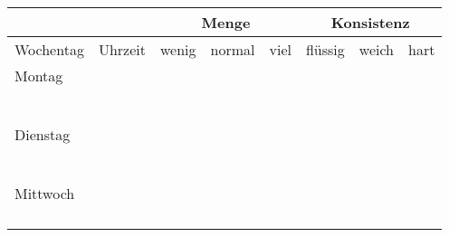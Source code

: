 \documentclass[a4paper]{article}
\begin{document}
\pagestyle{empty}
\centering
\begin{tabular}{lc||p{1.5cm}|p{1.5cm}|p{1.5cm}||p{1.5cm}|p{1.5cm}|p{1.5cm}}
  \toprule
  \multicolumn{2}{c}{} & \multicolumn{3}{c}{Menge} & \multicolumn{3}{c}{Konsistenz} \\
  \midrule
  Wochentag  & Uhrzeit & wenig & normal & viel     & flüssig & weich & hart \\
  \midrule
  Montag     &         &       &        &          &         &       &      \\
             &         &       &        &          &         &       &      \\
             &         &       &        &          &         &       &      \\
             &         &       &        &          &         &       &      \\
             &         &       &        &          &         &       &      \\
             &         &       &        &          &         &       &      \\
             &         &       &        &          &         &       &      \\
  \midrule
  Dienstag   &         &       &        &          &         &       &      \\
             &         &       &        &          &         &       &      \\
             &         &       &        &          &         &       &      \\
             &         &       &        &          &         &       &      \\
             &         &       &        &          &         &       &      \\
             &         &       &        &          &         &       &      \\
             &         &       &        &          &         &       &      \\
  \midrule
  Mittwoch   &         &       &        &          &         &       &      \\
             &         &       &        &          &         &       &      \\
             &         &       &        &          &         &       &      \\
             &         &       &        &          &         &       &      \\
             &         &       &        &          &         &       &      \\

\end{tabular}
\end{document}
